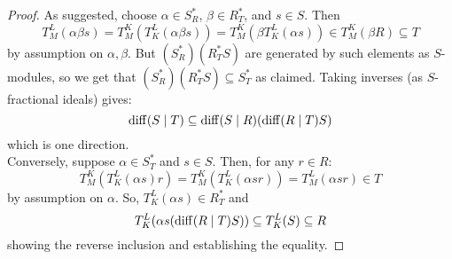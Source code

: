 \begin{proof}
	As suggested, choose $\alpha \in S_R^\ast$, $\beta \in R_T^\ast$, and $s \in S$. Then
	\[ T^L_M(\alpha\beta s) = T^K_M(T^L_K(\alpha\beta s)) = T^K_M(\beta T^L_K(\alpha s)) \in T^K_M(\beta R) \subseteq T \]
	by assumption on $\alpha,\beta$. But $(S_R^\ast)(R_T^\ast S)$ are generated by such elements as $S$-modules, so we get that $(S_R^\ast)(R_T^\ast S) \subseteq S_T^\ast$ as claimed. Taking inverses (as $S$-fractional ideals) gives:
	\[ \operatorname{diff}(S \mid T) \subseteq \operatorname{diff}(S \mid R)(\operatorname{diff}(R \mid T)S) \]
	which is one direction. \\
	
	Conversely, suppose $\alpha \in S_T^\ast$ and $s \in S$. Then, for any $r \in R$:
	\[ T^K_M(T^L_K(\alpha s)r) = T^K_M(T^L_K(\alpha sr)) = T^L_M(\alpha sr) \in T \]
	by assumption on $\alpha$. So, $T^L_K(\alpha s) \in R_T^\ast$ and
	\[ T^L_K(\alpha s (\operatorname{diff}(R \mid T)S)) \subseteq T^L_K(S) \subseteq R \]
	showing the reverse inclusion and establishing the equality.
\end{proof}
